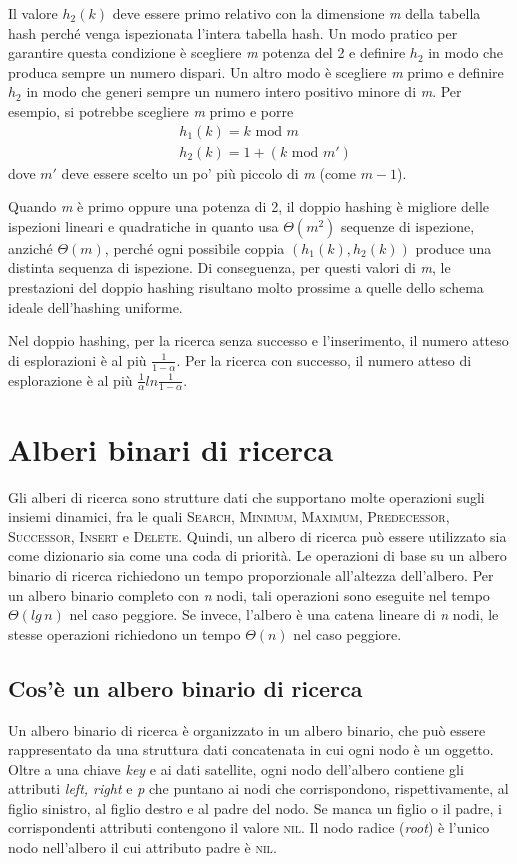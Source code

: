 \documentclass[10pt, a4paper]{report}
\begin{document}
Il valore $h_2(k)$ deve essere primo relativo con la dimensione \textit{m} della tabella hash perché venga ispezionata l'intera tabella hash. Un modo pratico per garantire questa condizione è scegliere \textit{m} potenza del 2 e definire $h_2$ in modo che produca sempre un numero dispari. Un altro modo è scegliere \textit{m} primo e definire $h_2$ in modo che generi sempre un numero intero positivo minore di \textit{m}. Per esempio, si potrebbe scegliere \textit{m} primo e porre
\begin{align*}
&h_1(k) = k \text{ mod } m \\
&h_2(k) = 1 + (k \text{ mod } m')
\end{align*}
dove $m'$ deve essere scelto un po' più piccolo di \textit{m} (come $m - 1$).

Quando \textit{m} è primo oppure una potenza di 2, il doppio hashing è migliore delle ispezioni lineari e quadratiche in quanto usa $\Theta(m^2)$ sequenze di ispezione, anziché $\Theta(m)$, perché ogni possibile coppia $(h_1(k),h_2(k))$ produce una distinta sequenza di ispezione. Di conseguenza, per questi valori di \textit{m}, le prestazioni del doppio hashing risultano molto prossime a quelle dello schema ideale dell'hashing uniforme.

Nel doppio hashing, per la ricerca senza successo e l'inserimento, il numero atteso di esplorazioni è al più $\frac{1}{1-\alpha}$. Per la ricerca con successo, il numero atteso di esplorazione è al più $\frac{1}{\alpha}ln\frac{1}{1-\alpha}$.
\chapter{Alberi binari di ricerca}
Gli alberi di ricerca sono strutture dati che supportano molte operazioni sugli insiemi dinamici, fra le quali \textsc{Search, Minimum, Maximum, Predecessor, Successor, Insert} e \textsc{Delete}. Quindi, un albero di ricerca può essere utilizzato sia come dizionario sia come una coda di priorità. Le operazioni di base su un albero binario di ricerca richiedono un tempo proporzionale all'altezza dell'albero. Per un albero binario completo con \textit{n} nodi, tali operazioni sono eseguite nel tempo $\Theta(lg\,n)$ nel caso peggiore. Se invece, l'albero è una catena lineare di \textit{n} nodi, le stesse operazioni richiedono un tempo $\Theta(n)$ nel caso peggiore.
\section{Cos'è un albero binario di ricerca}
Un albero binario di ricerca è organizzato in un albero binario, che può essere rappresentato da una struttura dati concatenata in cui ogni nodo è un oggetto. Oltre a una chiave \textit{key} e ai dati satellite, ogni nodo dell'albero contiene gli attributi \textit{left, right} e \textit{p} che puntano ai nodi che corrispondono, rispettivamente, al figlio sinistro, al figlio destro e al padre del nodo. Se manca un figlio o il padre, i corrispondenti attributi contengono il valore \textsc{nil}. Il nodo radice (\textit{root}) è l'unico nodo nell'albero il cui attributo padre è \textsc{nil}.
\end{document}
